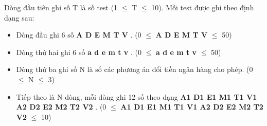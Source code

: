 Dòng đầu tiên ghi số T là số test (1  $\le$  T  $\le$  10). Mỗi test được ghi theo định dạng sau:
\begin{itemize}
	\item Dòng đầu ghi 6 số \textbf{ A D E M T V } . (0  $\le$  \textbf{ A D E M T V }  $\le$  50)
	\item Dòng thứ hai ghi 6 số \textbf{ a d e m t v } . (0  $\le$  \textbf{ a d e m t v }  $\le$  50)
	\item Dòng thứ ba ghi số N là số các phương án đổi tiền ngân hàng cho phép. (0  $\le$  N  $\le$  3)
	\item Tiếp theo là N dòng, mỗi dòng ghi 12 số theo dạng \textbf{ A1 D1 E1 M1 T1 V1 A2 D2 E2 M2 T2 V2 } . (0  $\le$  \textbf{ A1 D1 E1 M1 T1 V1 A2 D2 E2 M2 T2 V2 }  $\le$  10)
\end{itemize}

\